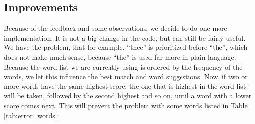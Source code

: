 \subsection{Improvements}
Because of the feedback and some observations, we decide to do one more implementation. It is not a big change in the code, but can still be fairly useful. We have the problem, that for example, ``thee'' is prioritized before ``the'', which does not make much sense, because ``the'' is used far more in plain language. Because the word list we are currently using is ordered by the frequency of the words, we let this influence the best match and word suggestions. Now, if two or more words have the same highest score, the one that is highest in the word list will be taken, followed by the second highest and so on, until a word with a lower score comes next. This will prevent the problem with some words listed in Table \ref{tab:error_words}.